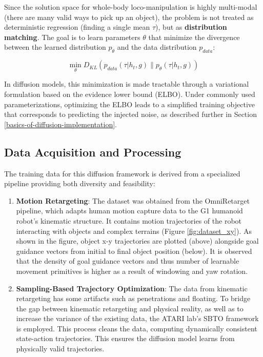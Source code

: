 Since the solution space for whole-body loco-manipulation is highly multi-modal (there
are many valid ways to pick up an object), the problem is not treated as
deterministic regression (finding a single mean \(\tau\)), but as
\textbf{distribution matching}. The goal is to learn parameters
\(\theta\) that minimize the divergence between the learned distribution
\(p_\theta\) and the data distribution \(p_{data}\):

\[
\min_\theta D_{KL}(p_{data}(\tau | h_t, g) \| p_\theta(\tau | h_t, g))
\]

In diffusion models, this minimization is made tractable through a variational formulation based on the evidence lower bound (ELBO). Under commonly used parameterizations, optimizing the ELBO leads to a simplified training objective that corresponds to predicting the injected noise, as described further in Section \ref{basics-of-diffusion-implementation}.

\subsection{Data Acquisition and
Processing}\label{data-acquisition-and-processing}

The training data for this diffusion framework is derived from a specialized
pipeline providing both diversity and feasibility:

\begin{enumerate}
\def\labelenumi{\arabic{enumi}.}
\item
  \textbf{Motion Retargeting}: The dataset was obtained from the OmniRetarget
  pipeline, which adapts human motion capture data to the G1 humanoid robot's
  kinematic structure. It contains motion trajectories of the robot interacting with objects and complex terrains (Figure \ref{fig:dataset_xy}). As shown in the figure, object x-y trajectories are plotted (above) alongside goal guidance vectors from initial to final object position (below). It is observed that the density of goal guidance vectors and thus number of learnable movement primitives is higher as a result of windowing and yaw rotation.
\item
  \textbf{Sampling-Based Trajectory Optimization}: The data from kinematic retargeting has some artifacts such as penetrations and floating. To bridge the gap between kinematic retargeting and physical reality, as well as to increase the variance of the existing data, the ATARI lab's SBTO framework is employed. This process cleans the data, computing dynamically consistent
  state-action trajectories. This ensures the diffusion model learns from physically valid trajectories.
\end{enumerate}

